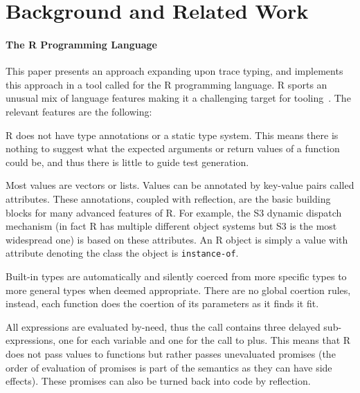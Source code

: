 \documentclass[sigplan,anonymous,review]{acmart}
\begin{document}
\section{Background and Related Work}
\label{sec:background}

\paragraph{The R Programming Language}

This paper presents an approach expanding upon trace typing, and implements this approach in a tool called \tool for the R programming language. 
R sports an unusual mix of language features making it a challenging target for
tooling~\cite{morandat2012evaluating}. 
The relevant features are the following:

\begin{compactitem}[$-$]

\item R does not have type annotations or a static type system. This means
    there is nothing to suggest what the expected arguments or return values of
    a function could be, and thus there is little to guide test generation.

\item Most values are vectors or lists. Values can be annotated by key-value
    pairs called attributes. These annotations, coupled with reflection, are
    the basic building blocks for many advanced features of R. For example, the
    S3 dynamic dispatch mechanism (in fact R has multiple different object
    systems but S3 is the most widespread one) is based on these attributes. An
    R object is simply a value with  attribute denoting the class
    the object is \texttt{instance-of}.

\item Built-in types are automatically and silently coerced from more specific
    types to more general types when deemed appropriate. There are no global
    coertion rules, instead, each function does the coertion of its parameters
    as it finds it fit.

\item All expressions are evaluated by-need, thus the call 
    contains three delayed sub-expressions, one for each variable and one for
    the call to plus. This means that R does not pass values to functions but
    rather passes unevaluated promises (the order of evaluation of promises is
    part of the semantics as they can have side effects). These promises can
    also be turned back into code by reflection.


\end{compactitem}
\end{document}
